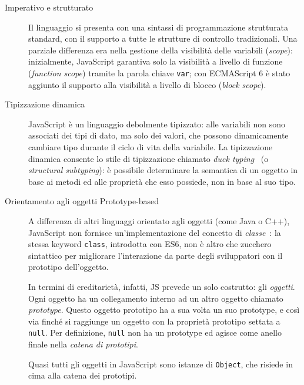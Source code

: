       \begin{description}
        \item[Imperativo e strutturato]
          Il linguaggio si presenta con una sintassi di programmazione strutturata standard, con il supporto a tutte le strutture di controllo tradizionali.
          Una parziale differenza era nella gestione della visibilità delle variabili (\emph{scope}):
          inizialmente, JavaScript garantiva solo la visibilità a livello di funzione (\emph{function scope}) tramite la parola chiave \texttt{var};
          con ECMAScript 6 è stato aggiunto il supporto alla visibilità a livello di blocco (\emph{block scope}).

        \item[Tipizzazione dinamica]
          JavaScript è un linguaggio debolmente tipizzato:
          alle variabili non sono associati dei tipi di dato, ma solo dei valori, che possono dinamicamente cambiare tipo durante il ciclo di vita della variabile.
          La tipizzazione dinamica consente lo stile di tipizzazione chiamato \emph{duck typing}~\cite{10.1145/2103621.2103686} (o \emph{structural subtyping}):
          è possibile determinare la semantica di un oggetto in base ai metodi ed alle proprietà che esso possiede,  non in base al suo tipo.

        \item[Orientamento agli oggetti Prototype-based]
          A differenza di altri linguaggi orientato agli oggetti (come Java o C++), JavaScript non fornisce un'implementazione del concetto di \emph{classe}~\cite{Ungar1991}:
          la stessa keyword \texttt{class}, introdotta con ES6, non è altro che zucchero sintattico per migliorare l'interazione da parte degli sviluppatori con il prototipo dell'oggetto.

          In termini di ereditarietà, infatti, JS prevede un solo costrutto: gli \emph{oggetti}.
          Ogni oggetto ha un collegamento interno ad un altro oggetto chiamato \emph{prototype}.
          Questo oggetto prototipo ha a sua volta un suo prototype, e così via finché si raggiunge un oggetto con la proprietà prototipo settata a \texttt{null}.
          Per definizione, \texttt{null} non ha un prototype ed agisce come anello finale nella \emph{catena di prototipi}.

          Quasi tutti gli oggetti in JavaScript sono istanze di \texttt{Object}, che risiede in cima alla catena dei prototipi.


\end{description}
